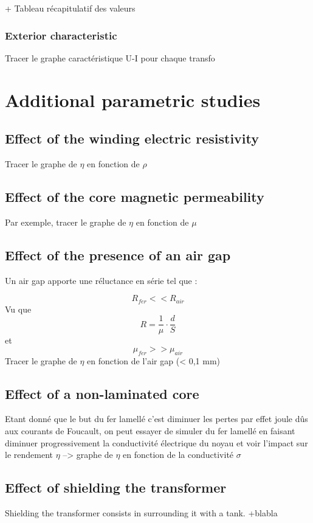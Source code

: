\documentclass[12pt,a4paper]{report}
\begin{document}
+ Tableau récapitulatif des valeurs

\subsubsection{Exterior characteristic}
Tracer le graphe caractéristique U-I pour chaque transfo

\section{Additional parametric studies}

\subsection{Effect of the winding electric resistivity}
Tracer le graphe de $\eta$ en fonction de $\rho$
\subsection{Effect of the core magnetic permeability}
Par exemple, tracer le graphe de $\eta$ en fonction de $\mu$
\subsection{Effect of the presence of an air gap}
Un air gap apporte une réluctance en série tel que :

\begin{equation}
    R_{fer} << R_{air}
\end{equation}
Vu que 
\begin{equation}
   R = \frac{1}{\mu} \cdot \frac{d}{S}
\end{equation}
et
\begin{equation}
   \mu_{fer} >> \mu_{air}
\end{equation}
Tracer le graphe de $\eta$ en fonction de l'air gap (< 0,1 mm)

\subsection{Effect of a non-laminated core}
Etant donné que le but du fer lamellé c'est diminuer les pertes par effet joule dûs aux courants de Foucault, on peut essayer de simuler du fer lamellé en faisant diminuer progressivement la conductivité électrique du noyau et voir l'impact sur le rendement $\eta$
--> graphe de $\eta$ en fonction de la conductivité $\sigma$
\subsection{Effect of shielding the transformer}
Shielding the transformer consists in surrounding it with a tank. +blabla\\
\end{document}

